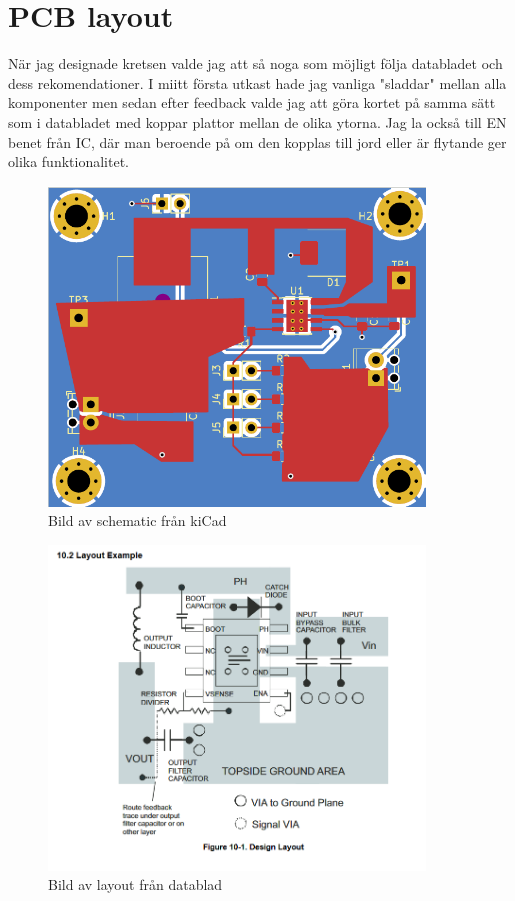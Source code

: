 \documentclass{article}
\begin{document}
\section{PCB layout}

När jag designade kretsen valde jag att så noga som möjligt följa databladet och dess
rekomendationer. I miitt första utkast hade jag vanliga "sladdar" mellan alla komponenter
men sedan efter feedback valde jag att göra kortet på samma sätt som i databladet med 
koppar plattor mellan de olika ytorna. Jag la också till EN benet från IC, där man
beroende på om den kopplas till jord eller är flytande ger olika funktionalitet. 

\begin{figure}[htp]
    \centering
    \includegraphics[width=10cm]{img/nylayout.png}
    \caption{Bild av schematic från kiCad}
\end{figure}

\begin{figure}[htp]
    \centering
    \includegraphics[width=10cm]{img/layout.png}
    \caption{Bild av layout från datablad}
\end{figure}
\end{document}
